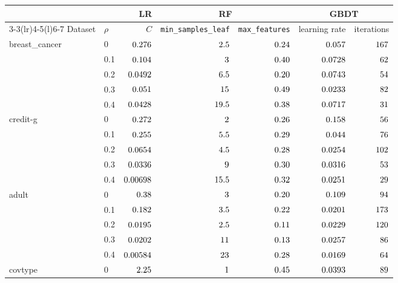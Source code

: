 \documentclass[11pt]{article}
\newcommand{\ds}[1]{\textsf{#1}}
\newcommand{\bc}{\ds{breast\_cancer}}
\newcommand{\cg}{\ds{credit-g}}
\newcommand{\ad}{\ds{adult}}
\newcommand{\ct}{\ds{covtype}}
\begin{document}
\begin{table}[!htbp]
\centering
\small
\begin{tabular}{@{}l l r r r r r@{}}
\toprule
 & & LR & \multicolumn{2}{c}{RF} & \multicolumn{2}{c}{GBDT} \\
\cmidrule(lr){3-3}\cmidrule(lr){4-5}\cmidrule(l){6-7}
Dataset & $\rho$ & $C$ & \texttt{min\_samples\_leaf} & \texttt{max\_features} & learning rate & iterations \\
\midrule
\bc & 0   & $0.276$  & $2.5$  & $0.24$  & $0.057$  & $167$ \\
    & 0.1 & $0.104$   & $3$   & $0.40$   & $0.0728$   & $62$ \\
    & 0.2 & $0.0492$   & $6.5$   & $0.20$   & $0.0743$   & $54$ \\
    & 0.3 & $0.051$ & $15$ & $0.49$ & $0.0233$ & $82$ \\
    & 0.4 & $0.0428$  & $19.5$  & $0.38$  & $0.0717$  & $31$ \\
\addlinespace
\cg & 0   & $0.272$  & $2$  & $0.26$  & $0.158$  & $56$ \\
    & 0.1 & $0.255$   & $5.5$   & $0.29$   & $0.044$   & $76$ \\
    & 0.2 & $0.0654$   & $4.5$   & $0.28$   & $0.0254$   & $102$ \\
    & 0.3 & $0.0336$ & $9$ & $0.30$ & $0.0316$ & $53$ \\
    & 0.4 & $0.00698$  & $15.5$  & $0.32$  & $0.0251$  & $29$ \\
\addlinespace
\ad & 0   & $0.38$  & $3$  & $0.20$  & $0.109$  & $94$ \\
    & 0.1 & $0.182$   & $3.5$   & $0.22$   & $0.0201$   & $173$ \\
    & 0.2 & $0.0195$   & $2.5$   & $0.11$   & $0.0229$   & $120$ \\
    & 0.3 & $0.0202$ & $11$ & $0.13$ & $0.0257$ & $86$ \\
    & 0.4 & $0.00584$  & $23$  & $0.28$  & $0.0169$  & $64$ \\
\addlinespace
\ct & 0   & $2.25$  & $1$  & $0.45$  & $0.0393$  & $89$ \\

\end{tabular}
\end{table}
\end{document}
